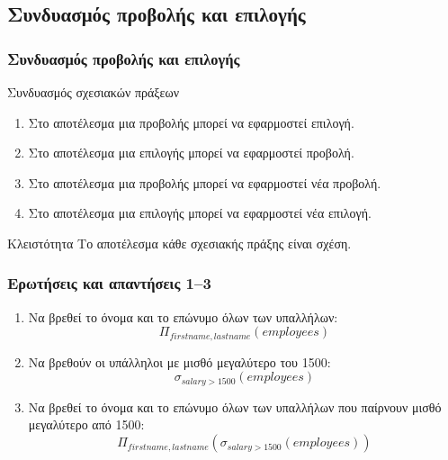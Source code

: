 \subsection[{\en Project}]{\textgreek{Συνδυασμός προβολής και επιλογής}}


\begin{frame}
\frametitle{Συνδυασμός προβολής και επιλογής}
\begin{minipage}{\wE}
  \begin{block}{Συνδυασμός σχεσιακών πράξεων}
    \begin{enumerate} \itemsep6pt
      \item Στο αποτέλεσμα μια προβολής μπορεί να εφαρμοστεί επιλογή.
      \item Στο αποτέλεσμα μια επιλογής μπορεί να εφαρμοστεί προβολή.
      \item Στο αποτέλεσμα μια προβολής μπορεί να εφαρμοστεί νέα προβολή.   
      \item Στο αποτέλεσμα μια επιλογής μπορεί να εφαρμοστεί νέα επιλογή.       
    \end{enumerate}
  \end{block}
  \begin{alertblock}{Κλειστότητα}
    Το αποτέλεσμα κάθε σχεσιακής πράξης είναι σχέση.
  \end{alertblock}
\end{minipage}
\end{frame}





\begin{frame}
\frametitle{Ερωτήσεις και απαντήσεις 1--3}
\begin{minipage}{0.94\textwidth}
  \begin{enumerate}
    \item Να βρεθεί το όνομα και το επώνυμο όλων των υπαλλήλων:
          \[ \Pi_{firstname, lastname}(employees) \]
    \item Να βρεθούν οι υπάλληλοι με μισθό μεγαλύτερο του 1500:
          \[ \sigma_{salary>1500}(employees) \]
    \item Να βρεθεί το όνομα και το επώνυμο όλων των υπαλλήλων που παίρνουν μισθό μεγαλύτερο από 1500:
          \[ \Pi_{firstname, lastname} \left(\sigma_{salary>1500}(employees)\right) \]
  \end{enumerate}
\end{minipage}
\end{frame}


